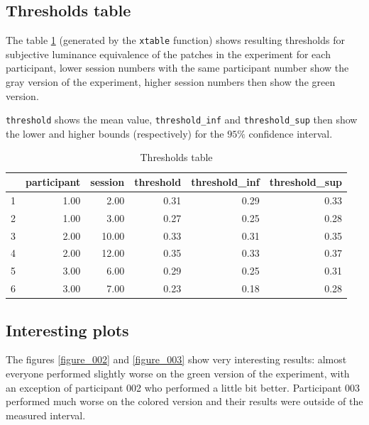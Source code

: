 \documentclass[a4paper,12pt]{article} %
\begin{document}
\subsection{Thresholds table}

The table \ref{thresholds_table} (generated by the \lstinline{xtable} function) shows resulting thresholds for subjective luminance equivalence of the patches in the experiment for each participant, lower session numbers with the same participant number show the gray version of the experiment, higher session numbers then show the green version.

\lstinline{threshold} shows the mean value, \lstinline{threshold_inf} and \lstinline{threshold_sup} then show the lower and higher bounds (respectively) for the $95\%$ confidence interval.

\begin{table}[!htb]
    \centering
    \caption{Thresholds table}
    \label{thresholds_table}
    \begin{tabular}{rrrrrr}
      \hline
     & participant & session & threshold & threshold\_inf & threshold\_sup \\ 
      \hline
    1 & 1.00 & 2.00 & 0.31 & 0.29 & 0.33 \\ 
      2 & 1.00 & 3.00 & 0.27 & 0.25 & 0.28 \\ 
      3 & 2.00 & 10.00 & 0.33 & 0.31 & 0.35 \\ 
      4 & 2.00 & 12.00 & 0.35 & 0.33 & 0.37 \\ 
      5 & 3.00 & 6.00 & 0.29 & 0.25 & 0.31 \\ 
      6 & 3.00 & 7.00 & 0.23 & 0.18 & 0.28 \\ 
       \hline
    \end{tabular}
\end{table}

\pagebreak

\subsection{Interesting plots}

The figures \ref{figure_002} and \ref{figure_003} show very interesting results: almost everyone performed slightly worse on the green version of the experiment, with an exception of participant 002 who performed a little bit better. Participant 003 performed much worse on the colored version and their results were outside of the measured interval.
\end{document}
